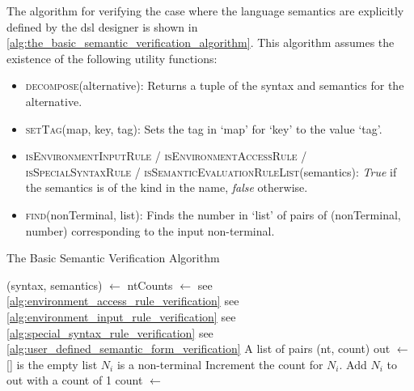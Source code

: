 The algorithm for verifying the case where the language semantics are explicitly defined by the \gls{dsl} designer is shown in \autoref{alg:the_basic_semantic_verification_algorithm}.
This algorithm assumes the existence of the following utility functions:
\begin{itemize}
    \item \textsc{decompose}(alternative): Returns a tuple of the syntax and semantics for the alternative.
    \item \textsc{setTag}(map, key, tag): Sets the tag in `map' for `key' to the value `tag'. 
    \item \textsc{isEnvironmentInputRule} / \textsc{isEnvironmentAccessRule} / \textsc{isSpecialSyntaxRule} / \textsc{isSemanticEvaluationRuleList}(semantics): \textit{True} if the semantics is of the kind in the name, \textit{false} otherwise.
    \item \textsc{find}(nonTerminal, list): Finds the number in `list' of pairs of (nonTerminal, number) corresponding to the input non-terminal.
\end{itemize}

\begin{breakablealgorithm}
\caption{The Basic Semantic Verification Algorithm}
\label{alg:the_basic_semantic_verification_algorithm}
\begin{algorithmic}
    \State (syntax, semantics) $\gets$ 
    \State ntCounts $\gets$ 
        \State {}
    \EndFor
    \State
        \State {}
        \Comment see \autoref{alg:environment_access_rule_verification}
        \State {}
        \Comment see \autoref{alg:environment_input_rule_verification}
        \State {}
        \Comment see \autoref{alg:special_syntax_rule_verification}
        \State {}
        \Comment see \autoref{alg:user_defined_semantic_form_verification}
    \EndIf
\EndFunction
\State
{}
\Comment A list of pairs (nt, count)
    \State out $\gets$ []
    \Comment [] is the empty list
        \Comment $N_i$ is a non-terminal
            \State Increment the count for $N_i$.
        \Else
            \State Add $N_i$ to out with a count of 1
        \EndIf
    \EndFor
    \State {}
\EndFunction
\State
{}
    \State count $\gets$ 
        \State {}
    \Else
        \State {}
    \EndIf
\EndFunction
\end{algorithmic}
\end{breakablealgorithm}

